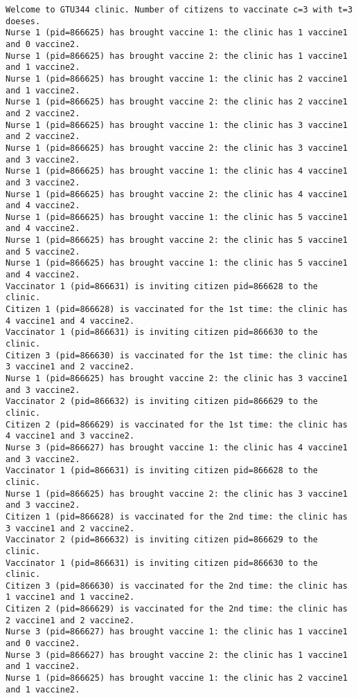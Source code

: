 \documentclass[a4paper]{article}
\begin{document}
\begin{verbatim}
Welcome to GTU344 clinic. Number of citizens to vaccinate c=3 with t=3 doeses.
Nurse 1 (pid=866625) has brought vaccine 1: the clinic has 1 vaccine1 and 0 vaccine2.
Nurse 1 (pid=866625) has brought vaccine 2: the clinic has 1 vaccine1 and 1 vaccine2.
Nurse 1 (pid=866625) has brought vaccine 1: the clinic has 2 vaccine1 and 1 vaccine2.
Nurse 1 (pid=866625) has brought vaccine 2: the clinic has 2 vaccine1 and 2 vaccine2.
Nurse 1 (pid=866625) has brought vaccine 1: the clinic has 3 vaccine1 and 2 vaccine2.
Nurse 1 (pid=866625) has brought vaccine 2: the clinic has 3 vaccine1 and 3 vaccine2.
Nurse 1 (pid=866625) has brought vaccine 1: the clinic has 4 vaccine1 and 3 vaccine2.
Nurse 1 (pid=866625) has brought vaccine 2: the clinic has 4 vaccine1 and 4 vaccine2.
Nurse 1 (pid=866625) has brought vaccine 1: the clinic has 5 vaccine1 and 4 vaccine2.
Nurse 1 (pid=866625) has brought vaccine 2: the clinic has 5 vaccine1 and 5 vaccine2.
Nurse 1 (pid=866625) has brought vaccine 1: the clinic has 5 vaccine1 and 4 vaccine2.
Vaccinator 1 (pid=866631) is inviting citizen pid=866628 to the clinic.
Citizen 1 (pid=866628) is vaccinated for the 1st time: the clinic has 4 vaccine1 and 4 vaccine2. 
Vaccinator 1 (pid=866631) is inviting citizen pid=866630 to the clinic.
Citizen 3 (pid=866630) is vaccinated for the 1st time: the clinic has 3 vaccine1 and 2 vaccine2. 
Nurse 1 (pid=866625) has brought vaccine 2: the clinic has 3 vaccine1 and 3 vaccine2.
Vaccinator 2 (pid=866632) is inviting citizen pid=866629 to the clinic.
Citizen 2 (pid=866629) is vaccinated for the 1st time: the clinic has 4 vaccine1 and 3 vaccine2. 
Nurse 3 (pid=866627) has brought vaccine 1: the clinic has 4 vaccine1 and 3 vaccine2.
Vaccinator 1 (pid=866631) is inviting citizen pid=866628 to the clinic.
Nurse 1 (pid=866625) has brought vaccine 2: the clinic has 3 vaccine1 and 3 vaccine2.
Citizen 1 (pid=866628) is vaccinated for the 2nd time: the clinic has 3 vaccine1 and 2 vaccine2. 
Vaccinator 2 (pid=866632) is inviting citizen pid=866629 to the clinic.
Vaccinator 1 (pid=866631) is inviting citizen pid=866630 to the clinic.
Citizen 3 (pid=866630) is vaccinated for the 2nd time: the clinic has 1 vaccine1 and 1 vaccine2. 
Citizen 2 (pid=866629) is vaccinated for the 2nd time: the clinic has 2 vaccine1 and 2 vaccine2. 
Nurse 3 (pid=866627) has brought vaccine 1: the clinic has 1 vaccine1 and 0 vaccine2.
Nurse 3 (pid=866627) has brought vaccine 2: the clinic has 1 vaccine1 and 1 vaccine2.
Nurse 1 (pid=866625) has brought vaccine 1: the clinic has 2 vaccine1 and 1 vaccine2.

\end{verbatim}
\end{document}
